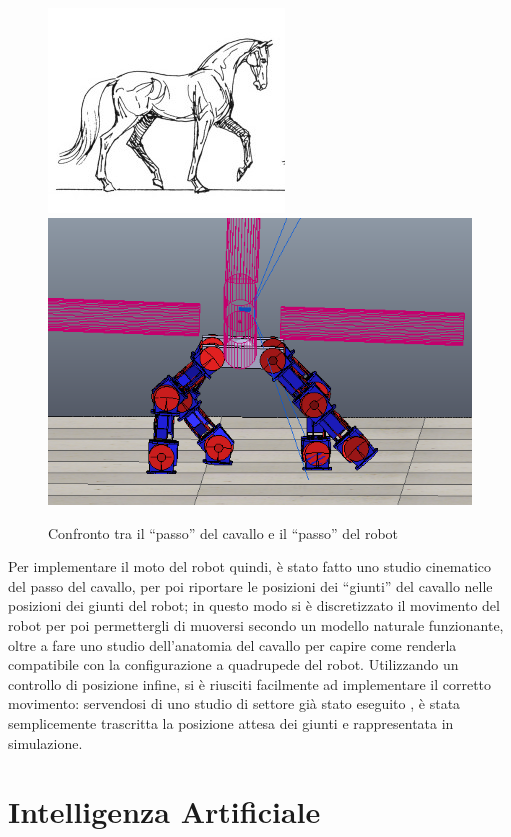 \documentclass[a4paper,titlepage]{book}
\begin{document}
\begin{figure}[htbp]
\centering
\includegraphics[scale=0.5]{cavallo_passo.jpg}
\qquad\qquad
\includegraphics[scale=0.25]{passo1.png}
\caption{Confronto tra il ``passo'' del cavallo e il ``passo'' del robot}\label{fig:7}
\end{figure}

Per implementare il moto del robot quindi, è stato fatto uno studio cinematico del passo del cavallo, per poi riportare le posizioni dei ``giunti'' del cavallo nelle posizioni dei giunti del robot; in questo modo si è discretizzato il movimento del robot per poi permettergli di muoversi secondo un modello naturale funzionante, oltre a fare uno studio dell'anatomia del cavallo per capire come renderla compatibile con la configurazione a quadrupede del robot.
Utilizzando un controllo di posizione infine, si è riusciti facilmente ad implementare il corretto movimento: servendosi di uno studio di settore già stato eseguito \cite{robot_horse}, è stata semplicemente trascritta la posizione attesa dei giunti e rappresentata in simulazione.

\section{Intelligenza Artificiale}
\end{document}
